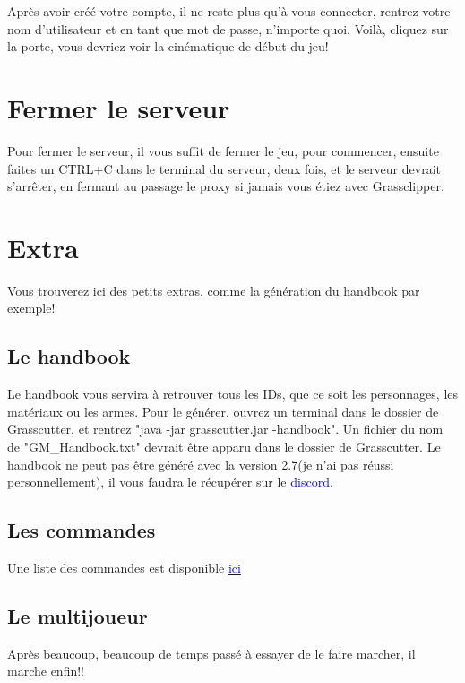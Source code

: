 \documentclass{article}
\begin{document}
Après avoir créé votre compte, il ne reste plus qu'à vous connecter, rentrez votre nom d'utilisateur et en tant que mot de passe, n'importe quoi.\newline
Voilà, cliquez sur la porte, vous devriez voir la cinématique de début du jeu!

\hrulefill

\section{Fermer le serveur}
Pour fermer le serveur, il vous suffit de fermer le jeu, pour commencer, ensuite faites un CTRL+C dans le terminal du serveur, deux fois, et le serveur devrait s'arrêter, en fermant au passage le proxy si jamais vous étiez avec Grassclipper.

\hrulefill

\section{Extra}
Vous trouverez ici des petits extras, comme la génération du handbook par exemple!

\subsection{Le handbook}
Le handbook vous servira à retrouver tous les IDs, que ce soit les personnages, les matériaux ou les armes.\newline
Pour le générer, ouvrez un terminal dans le dossier de Grasscutter, et rentrez "java -jar grasscutter.jar -handbook". Un fichier du nom de "GM\_Handbook.txt" devrait être apparu dans le dossier de Grasscutter.\newline
Le handbook ne peut pas être généré avec la version 2.7(je n'ai pas réussi personnellement), il vous faudra le récupérer sur le \href{https://discord.gg/ZwKEJn7sxT}{\textcolor{blue}{discord}}.

\subsection{Les commandes}
Une liste des commandes est disponible \href{https://github.com/Grasscutters/Grasscutter/wiki/Commands}{\textcolor{blue}{ici}}

\subsection{Le multijoueur}
Après beaucoup, beaucoup de temps passé à essayer de le faire marcher, il marche enfin!!
\end{document}
